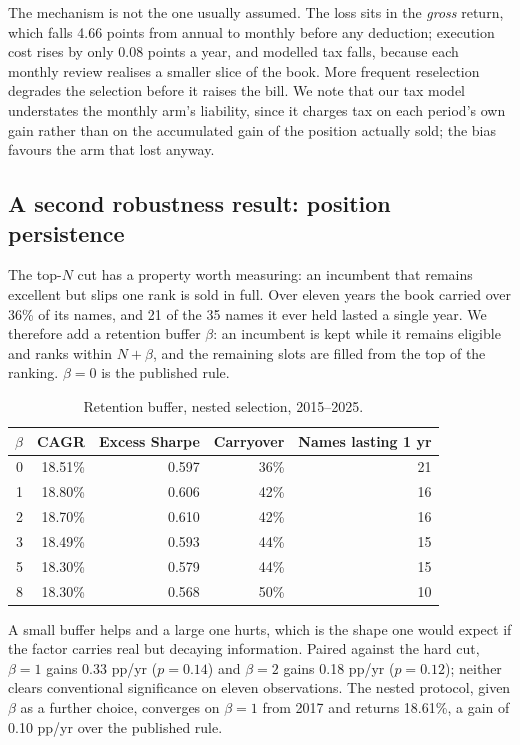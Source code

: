 \documentclass[10pt,conference]{IEEEtran}
\begin{document}
The mechanism is not the one usually assumed. The loss sits in the \emph{gross} return, which falls 4.66 points from annual to monthly before any deduction; execution cost rises by only 0.08 points a year, and modelled tax falls, because each monthly review realises a smaller slice of the book. More frequent reselection degrades the selection before it raises the bill. We note that our tax model understates the monthly arm's liability, since it charges tax on each period's own gain rather than on the accumulated gain of the position actually sold; the bias favours the arm that lost anyway.

\subsection{A second robustness result: position persistence}

The top-$N$ cut has a property worth measuring: an incumbent that remains excellent but slips one rank is sold in
full. Over eleven years the book carried over 36\% of its names, and 21 of the 35 names it ever held lasted a single
year. We therefore add a retention buffer $\beta$: an incumbent is kept while it remains eligible and ranks within
$N + \beta$, and the remaining slots are filled from the top of the ranking. $\beta = 0$ is the published rule.

\begin{table}[t]
\caption{Retention buffer, nested selection, 2015--2025.}
\centering
\begin{tabular}{rrrrr}
\toprule
$\beta$ & CAGR & Excess Sharpe & Carryover & Names lasting 1 yr \\
\midrule
0 & 18.51\% & 0.597 & 36\% & 21 \\
1 & 18.80\% & 0.606 & 42\% & 16 \\
2 & 18.70\% & 0.610 & 42\% & 16 \\
3 & 18.49\% & 0.593 & 44\% & 15 \\
5 & 18.30\% & 0.579 & 44\% & 15 \\
8 & 18.30\% & 0.568 & 50\% & 10 \\
\bottomrule
\end{tabular}
\label{tab:persistence}
\end{table}

A small buffer helps and a large one hurts, which is the shape one would expect if the factor carries real but decaying
information. Paired against the hard cut, $\beta=1$ gains 0.33 pp/yr ($p=0.14$) and $\beta=2$ gains 0.18 pp/yr
($p=0.12$); neither clears conventional significance on eleven observations. The nested protocol, given $\beta$ as a
further choice, converges on $\beta=1$ from 2017 and returns 18.61\%, a gain of 0.10 pp/yr over the published rule.
\end{document}
